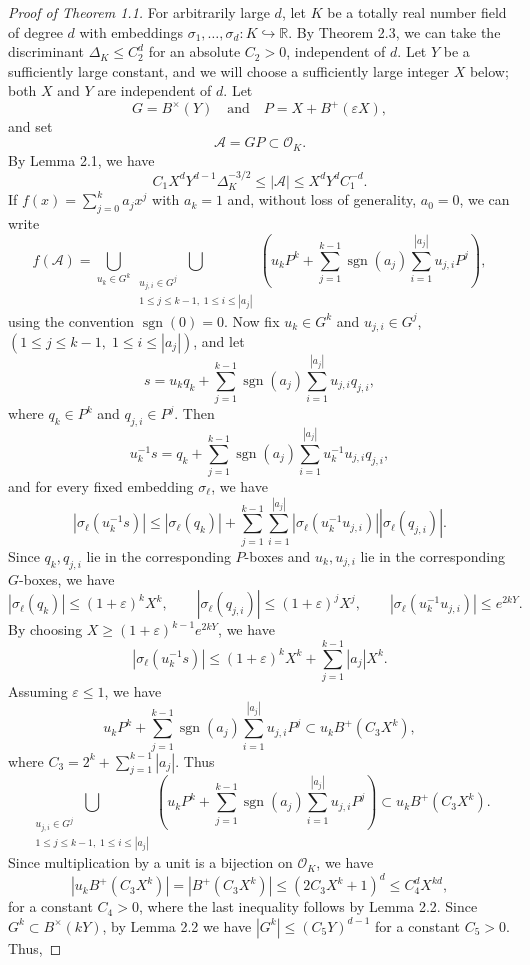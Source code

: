 \documentclass[11pt]{amsart}
\theoremstyle{plain}
\theoremstyle{definition}\newtheorem{remark}[theorem]{Remark}
\theoremstyle{definition}\newtheorem*{remark*}{Remark}
\theoremstyle{definition}\newtheorem{definition}[theorem]{Definition}
\theoremstyle{definition}\newtheorem*{definition*}{Definition}
\theoremstyle{definition}\newtheorem*{idea}{Idea}
\theoremstyle{definition}\newtheorem*{comments}{Comment}
\theoremstyle{definition}\newtheorem{example}[theorem]{Example}
\theoremstyle{definition}\newtheorem*{example*}{Example}
\newcommand{\0}{\varnothing} %
\renewcommand{\epsilon}{\varepsilon} %
\def\R{\mathbb{R}} %
\begin{document}
\begin{proof}[Proof of Theorem 1.1] For arbitrarily large $d$, let $K$ be a totally real number field of degree $d$ with embeddings $\sigma_1,\dots,\sigma_d:K\hookrightarrow\R$. By Theorem 2.3, we can take the discriminant $\Delta_K\leq C_2^d$ for an absolute $C_2>0$, independent of $d$. Let $Y$ be a sufficiently large constant, and we will choose a sufficiently large integer $X$ below; both $X$ and $Y$ are independent of $d$. Let 
\[
G=B^\times(Y)\quad\text{and}\quad P=X+B^+(\epsilon X),
\]
and set 
\[
\mathcal A=GP\subset \mathcal O_K.
\]
By Lemma 2.1, we have
\[
C_1X^dY^{d-1}\Delta_K^{-3/2}\leq |\mathcal A|\leq X^dY^dC_1^{-d}.
\tag{1}
\]
If $f(x)=\sum_{j=0}^k a_jx^j$ with $a_k=1$ and, without loss of generality, $a_0=0$, we can write
\[
f(\mathcal A)=\bigcup_{u_k\in G^k}\bigcup_{\substack{u_{j,i}\in G^j\\1\leq j\leq k-1,\;1\leq i\leq |a_j|}}\left(u_kP^k+\sum_{j=1}^{k-1}\operatorname{sgn}(a_j)\sum_{i=1}^{|a_j|}u_{j,i}P^j\right),
\]
using the convention $\operatorname{sgn}(0)=0$. Now fix $u_k\in G^k$ and $u_{j,i}\in G^j$, $(1\leq j\leq k-1,\;1\leq i\leq |a_j|)$, and let
\[
s=u_k q_k+\sum_{j=1}^{k-1}\operatorname{sgn}(a_j)\sum_{i=1}^{|a_j|}u_{j,i}q_{j,i},
\]
where $q_k\in P^k$ and $q_{j,i}\in P^j$. Then
\[
u_k^{-1}s=q_k+\sum_{j=1}^{k-1}\operatorname{sgn}(a_j)\sum_{i=1}^{|a_j|}u_k^{-1}u_{j,i}q_{j,i},
\]
and for every fixed embedding $\sigma_\ell$, we have
\[
|\sigma_\ell(u_k^{-1}s)|\leq|\sigma_\ell(q_k)|+\sum_{j=1}^{k-1}\sum_{i=1}^{|a_j|}|\sigma_\ell(u_k^{-1}u_{j,i})||\sigma_\ell(q_{j,i})|.
\]
Since $q_k,q_{j,i}$ lie in the corresponding $P$-boxes and
$u_k,u_{j,i}$ lie in the corresponding $G$-boxes, we have
\[
|\sigma_\ell(q_k)|\leq (1+\epsilon)^kX^k,\qquad
|\sigma_\ell(q_{j,i})|\leq (1+\epsilon)^jX^j,\qquad
|\sigma_\ell(u_k^{-1}u_{j,i})|\leq e^{2kY}.
\]
By choosing $X\geq (1+\epsilon)^{k-1}e^{2kY}$, we have
\[
|\sigma_\ell(u_k^{-1}s)|\leq(1+\epsilon)^kX^k+\sum_{j=1}^{k-1}|a_j|X^k.
\]
Assuming \(\epsilon\leq 1\), we have
\[u_kP^k+\sum_{j=1}^{k-1}\operatorname{sgn}(a_j)\sum_{i=1}^{|a_j|}u_{j,i}P^j\subset u_kB^+(C_3X^k),
\]
where $C_3=2^k+\sum_{j=1}^{k-1}|a_j|$. Thus
\[
\bigcup_{\substack{u_{j,i}\in G^j\\1\leq j\leq k-1,\;1\leq i\leq |a_j|}}\left(u_kP^k+\sum_{j=1}^{k-1}\operatorname{sgn}(a_j)\sum_{i=1}^{|a_j|}u_{j,i}P^j\right)
\subset u_kB^+(C_3X^k).
\]
Since multiplication by a unit is a bijection on $\mathcal O_K$, we have 
\[
|u_kB^+(C_3X^k)|=|B^+(C_3X^k)|\leq (2C_3X^k+1)^d\leq C_4^d X^{kd},
\]
for a constant $C_4>0$, where the last inequality follows by Lemma 2.2. Since $G^k\subset B^\times(kY)$, by Lemma 2.2 we have $|G^k|\leq(C_5Y)^{d-1}$ for a constant $C_5>0$. Thus, 

\end{proof}
\end{document}
